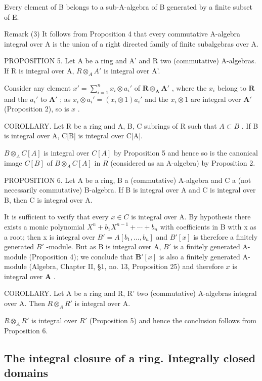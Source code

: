 Every element of B belongs to a sub-A-algebra of B generated by a finite subset of E.

Remark (3) It follows from Proposition 4 that every commutative A-algebra integral over A is the union of a right directed family of finite subalgebras over A.

PROPOSITION 5. Let A be a ring and A' and R two (commutative) A-algebras. If R is integral over A, \(R \otimes_{A} A'\) is integral over A'.

Consider any element \(x' = \sum_{i=1}^{n} x_i \otimes a_i'\) of \(\mathbf{R} \otimes_{\mathbf{A}} \mathbf{A}'\) , where the \(x_i\) belong to \(\mathbf{R}\) and the \(a_i'\) to \(\mathbf{A}'\) ; as \(x_i \otimes a_i' = (x_i \otimes 1)a_i'\) and the \(x_i \otimes 1\) are integral over \(\mathbf{A}'\) (Proposition 2), so is \(x\) .

COROLLARY. Let R be a ring and A, B, C subrings of R such that \(A \subset B\) . If B is integral over A, C{[}B{]} is integral over C{[}A{]}.

\(B \otimes_{A} C[A]\) is integral over \(C[A]\) by Proposition 5 and hence so is the canonical image \(C[B]\) of \(B \otimes_{A} C[A]\) in \(R\) (considered as an A-algebra) by Proposition 2.

PROPOSITION 6. Let A be a ring, B a (commutative) A-algebra and C a (not necessarily commutative) B-algebra. If B is integral over A and C is integral over B, then C is integral over A.

It is sufficient to verify that every \(x \in C\) is integral over A. By hypothesis there exists a monic polynomial \(X^{n} + b_{1}X^{n-1} + \cdots + b_{n}\) with coefficients in B with x as a root; then x is integral over \(B' = A[b_{1}, \ldots, b_{n}]\) and \(B'[x]\) is therefore a finitely generated \(B'\) -module. But as B is integral over A, \(B'\) is a finitely generated A-module (Proposition 4); we conclude that \(\mathbf{B}'[x]\) is also a finitely generated A-module (Algebra, Chapter II, §1, no. 13, Proposition 25) and therefore \(x\) is integral over \(\mathbf{A}\) .

COROLLARY. Let A be a ring and R, R' two (commutative) A-algebras integral over A. Then \(R \otimes_{A} R'\) is integral over A.

\(R \otimes_{A} R'\) is integral over \(R'\) (Proposition 5) and hence the conclusion follows from Proposition 6.

\subsection{The integral closure of a ring. Integrally closed domains}

